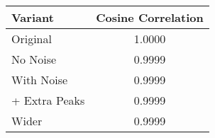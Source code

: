 \begin{tabular}{l c}
\hline
Variant & Cosine Correlation \\
\hline
Original & 1.0000 \\
No Noise & 0.9999 \\
With Noise & 0.9999 \\
+ Extra Peaks & 0.9999 \\
Wider & 0.9999 \\
\hline
\end{tabular}
